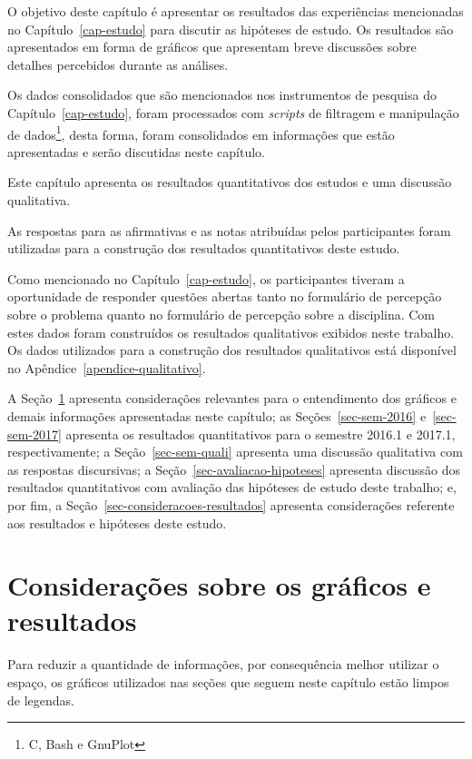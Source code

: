 

\label{cap-resultados}
\acresetall

O objetivo deste capítulo é apresentar os resultados das experiências
mencionadas no Capítulo~\ref{cap-estudo} para discutir as
hipóteses de estudo.
Os resultados são apresentados em forma de gráficos que apresentam
breve discussões sobre detalhes percebidos durante as análises.

Os dados consolidados que são mencionados nos instrumentos de pesquisa
do Capítulo~\ref{cap-estudo}, foram processados com
\textit{scripts} de filtragem e manipulação
de dados\footnote{C, Bash e GnuPlot}, desta forma,
foram consolidados em informações que estão
apresentadas e serão discutidas neste capítulo.

Este capítulo apresenta os resultados quantitativos
dos estudos e uma discussão qualitativa.

As respostas para as afirmativas e as notas atribuídas
pelos participantes foram utilizadas para a construção
dos resultados quantitativos deste estudo.

Como mencionado no Capítulo~\ref{cap-estudo}, os participantes
tiveram a oportunidade de responder questões abertas tanto no
formulário de percepção sobre o problema quanto no formulário
de percepção sobre a disciplina.
Com estes dados foram construídos os resultados qualitativos
exibidos neste trabalho.
Os dados utilizados para a construção dos resultados
qualitativos está disponível no Apêndice~\ref{apendice-qualitativo}.

A Seção~\ref{sec-ref-graficos} apresenta considerações relevantes para o
entendimento dos gráficos e demais informações apresentadas neste capítulo;
as Seções~\ref{sec-sem-2016} e~\ref{sec-sem-2017}
apresenta os resultados quantitativos para o semestre 2016.1 e 2017.1, respectivamente;
a Seção~\ref{sec-sem-quali} apresenta uma discussão qualitativa com as respostas
discursivas;
a Seção~\ref{sec-avaliacao-hipoteses} apresenta discussão dos resultados
quantitativos com avaliação das hipóteses de estudo deste trabalho;
e, por fim, a Seção~\ref{sec-consideracoes-resultados} apresenta
considerações referente aos resultados e hipóteses
deste estudo.

\section{Considerações sobre os gráficos e resultados}
\label{sec-ref-graficos}
Para reduzir a quantidade de informações, por consequência melhor utilizar o
espaço, os gráficos utilizados nas seções que seguem neste capítulo
estão limpos de legendas.

